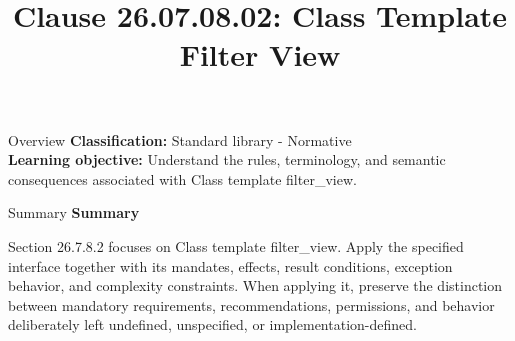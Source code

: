 \documentclass[10pt,letterpaper]{article}
\title{Clause 26.07.08.02: Class Template Filter View}
\author{}
\date{}
\begin{document}
\maketitle
\begin{CornellOverviewBox}{Overview}
\textbf{Classification:} Standard library - Normative\\[2pt]
\textbf{Learning objective:} Understand the rules, terminology, and semantic consequences associated with Class template filter\_view.
\end{CornellOverviewBox}\begin{CornellSummaryBox}{Summary}
{\sffamily\bfseries\color{Accent} Summary}\par\vspace{3pt}Section 26.7.8.2 focuses on Class template filter\_view. Apply the specified interface together with its mandates, effects, result conditions, exception behavior, and complexity constraints. When applying it, preserve the distinction between mandatory requirements, recommendations, permissions, and behavior deliberately left undefined, unspecified, or implementation-defined.
\end{CornellSummaryBox}
\end{document}
